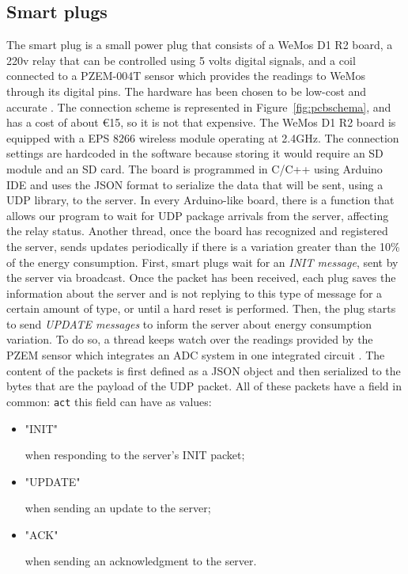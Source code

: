 \documentclass[conference]{IEEEtran}
\begin{document}
	\subsection{Smart plugs}\label{SP}
	The smart plug is a small power plug that consists of a WeMos D1 R2 board, a 220v relay that can be controlled using 5 volts digital signals, and a coil connected to a PZEM-004T sensor \cite{8442052} \cite{8250475}  which provides the readings to WeMos through its digital pins. The hardware has been chosen to be low-cost and accurate \cite{8442066}.
	The connection scheme is represented in Figure~\ref{fig:pcbschema}, and has a cost of about €15, so it is not that expensive. 
	The WeMos D1 R2 board is equipped with a EPS 8266 wireless module operating at 2.4GHz. The connection settings are hardcoded in the software because storing it would require an SD module and an SD card. The board is programmed in C/C++ using Arduino IDE and uses the JSON format to serialize the data that will be sent, using a UDP library, to the server.
	In every Arduino-like board, there is a function that allows our program to wait for UDP package arrivals from the server, affecting the relay status.
	Another thread, once the board has recognized and registered the server, sends updates periodically if there is a variation greater than the 10\% of the energy consumption.
	First, smart plugs wait for an \textit{INIT message}, sent by the server via broadcast. Once the packet has been received, each plug saves the information about the server and is not replying to this type of message for a certain amount of type, or until a hard reset is performed. 
	Then, the plug starts to send \textit{UPDATE messages} to inform the server about energy consumption variation. To do so, a thread keeps watch over the readings provided by the PZEM sensor which integrates an ADC  system  in one integrated circuit \cite{8612412}.
	The content of the packets is first defined as a JSON object and then serialized to the bytes that are the payload of the UDP packet. All of these packets have a field in common: \verb|act| this field can have as values:
	\begin{itemize}
		\item \begin{spverbatim}"INIT"\end{spverbatim} when responding to the server's INIT packet;
		\item \begin{spverbatim}"UPDATE"\end{spverbatim} when sending an update to the server;
		\item \begin{spverbatim}"ACK"\end{spverbatim} when sending an acknowledgment to the server.
	\end{itemize}
\end{document}
